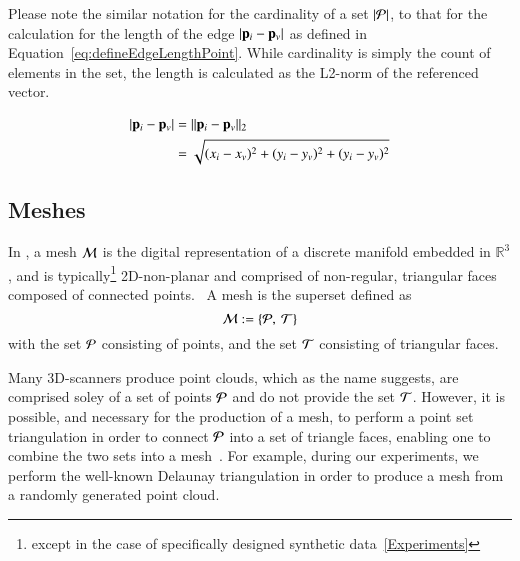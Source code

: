 Please note the similar notation for the cardinality of a set $|\mathcal{P}|$, to that for the calculation for the length of the edge $|\mathbf{p}_i - \mathbf{p}_v|$ as defined in Equation~\ref{eq:defineEdgeLengthPoint}. While cardinality is simply the count of elements in the set, the length is calculated as the L2-norm of the referenced vector.~\cite[p.~26]{Mara12}

\begin{equation}
\begin{aligned}
	|\mathbf{p}_i - \mathbf{p}_v| & = \lVert\mathbf{p}_i - \mathbf{p}_v\rVert_2 \\
					& = \sqrt{(x_i-x_v)^2 + (y_i-y_v)^2 + (y_i-y_v)^2}
	\label{eq:defineEdgeLengthCalc}
\end{aligned}
\end{equation}

%
%
%
\subsection{Meshes}
\label{ch2s3ssM}
In \tdd{}, a mesh $\mathcal{M}$ is the digital representation of a discrete manifold embedded in $\mathbb{R}^3$, and is typically\footnote{except in the case of specifically designed synthetic data~\ref{Experiments}} 2D-non-planar and comprised of non-regular, triangular faces composed of connected points.~\cite[p.~25]{Mara12} A mesh is the superset defined as
%
\begin{equation}
	\mathcal{M} := \left \{\mathcal{P},\:\mathcal{T}\right \}
	\label{eq:defineMesh}
\end{equation}%
%
%
with the set $\mathcal{P}$ consisting of points, and the set $\mathcal{T}$ consisting of triangular faces.

Many 3D-scanners produce point clouds\todoCitation{}{}, which as the name suggests, are comprised soley of a set of points $\mathcal{P}$ and do not provide the set $\mathcal{T}$. However, it is possible, and necessary for the production of a mesh, to perform a point set triangulation\todoCitation{}{} in order to connect $\mathcal{P}$ into a set of triangle faces, enabling one to combine the two sets into a mesh~\cite[p.~26]{Mara12}. For example, during our experiments, we perform the well-known Delaunay triangulation\todoCitation{} in order to produce a mesh from a randomly generated point cloud.

